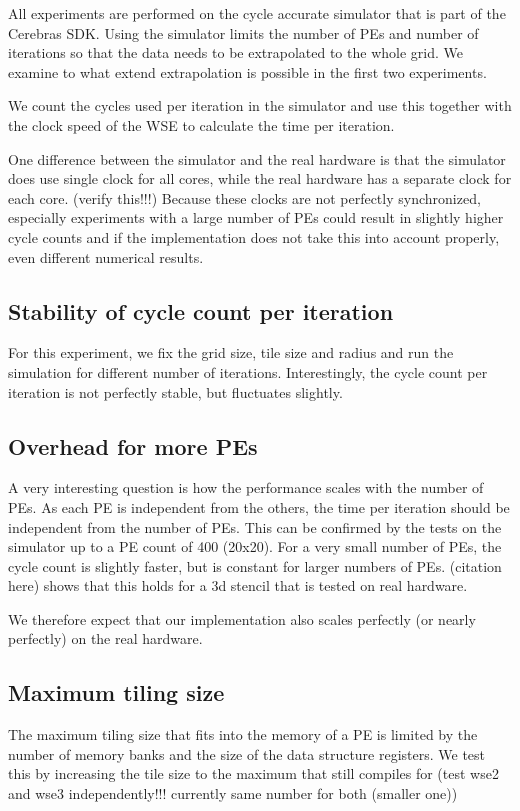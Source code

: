 \documentclass{article}
\begin{document}
All experiments are performed on the cycle accurate simulator that is part of the Cerebras SDK.
Using the simulator limits the number of PEs and number of iterations so that the data needs to be extrapolated to the whole grid.
We examine to what extend extrapolation is possible in the first two experiments.

We count the cycles used per iteration in the simulator and use this together with the clock speed of the WSE to calculate the time per iteration.

One difference between the simulator and the real hardware is that the simulator does use single clock for all cores, while the real hardware has a separate clock for each core. (verify this!!!) Because these clocks are not perfectly synchronized, especially experiments with a large number of PEs could result in slightly higher cycle counts and if the implementation does not take this into account properly, even different numerical results.

\subsection{Stability of cycle count per iteration}
For this experiment, we fix the grid size, tile size and radius and run the simulation for different number of iterations.
Interestingly, the cycle count per iteration is not perfectly stable, but fluctuates slightly.


\subsection{Overhead for more PEs}
A very interesting question is how the performance scales with the number of PEs.
As each PE is independent from the others, the time per iteration should be independent from the number of PEs.
This can be confirmed by the tests on the simulator up to a PE count of 400 (20x20).
For a very small number of PEs, the cycle count is slightly faster, but is constant for larger numbers of PEs.
(citation here) shows that this holds for a 3d stencil that is tested on real hardware.

We therefore expect that our implementation also scales perfectly (or nearly perfectly) on the real hardware.

\subsection{Maximum tiling size}
The maximum tiling size that fits into the memory of a PE is limited by the number of memory banks and the size of the data structure registers.
We test this by increasing the tile size to the maximum that still compiles for (test wse2 and wse3 independently!!! currently same number for both (smaller one))
\end{document}

